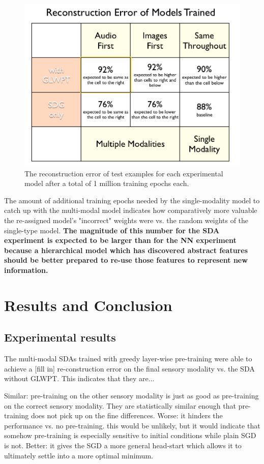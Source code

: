 \documentclass[12pt]{article}
\begin{document}
\begin{doublespacing}
\begin{figure}[p]
\centering
\includegraphics[width=6in]{table_of_models}
\caption{The reconstruction error of test examples for each experimental model after a total of 1 million training epochs each. }
\end{figure}

	The amount of additional training epochs needed by the single-modality model to catch up with the multi-modal model indicates how comparatively more valuable the re-assigned model's "incorrect" weights were vs. the random weights of the single-type model. \textbf{The magnitude of this number for the SDA experiment is expected to be larger than for the NN experiment because a hierarchical model which has discovered abstract features should be better prepared to re-use those features to represent new information.}
	
\section{Results and Conclusion}
	\subsection{Experimental results}
		The multi-modal SDAs trained with greedy layer-wise pre-training were able to achieve a [fill in] re-construction error on the final sensory modality vs. the SDA without GLWPT. This indicates that they are... 
		
		Similar: pre-training on the other sensory modality is just as good as pre-training on the correct sensory modality. They are statistically similar enough that pre-training does not pick up on the fine differences.
		Worse: it hinders the performance vs. no pre-training. this would be unlikely, but it would indicate that somehow pre-training is especially sensitive to initial conditions while plain SGD is not.
		Better: it gives the SGD a more general head-start which allows it to ultimately settle into a more optimal minimum.
	

\end{doublespacing}
\end{document}
